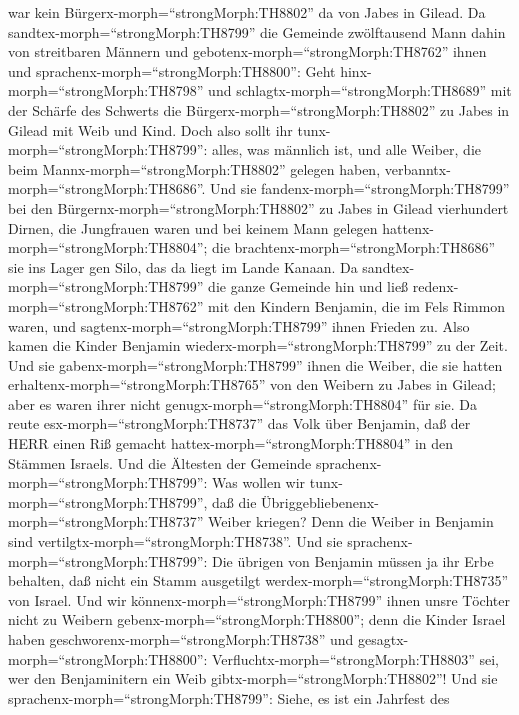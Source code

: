 war kein Bürgerx-morph=``strongMorph:TH8802'' da von Jabes in Gilead.
 Da sandtex-morph=``strongMorph:TH8799'' die Gemeinde
zwölftausend Mann dahin von streitbaren Männern und
gebotenx-morph=``strongMorph:TH8762'' ihnen und
sprachenx-morph=``strongMorph:TH8800'': Geht
hinx-morph=``strongMorph:TH8798'' und
schlagtx-morph=``strongMorph:TH8689'' mit der Schärfe des Schwerts die
Bürgerx-morph=``strongMorph:TH8802'' zu Jabes in Gilead mit Weib und
Kind.  Doch also sollt ihr
tunx-morph=``strongMorph:TH8799'': alles, was männlich ist, und alle
Weiber, die beim Mannx-morph=``strongMorph:TH8802'' gelegen haben,
verbanntx-morph=``strongMorph:TH8686''.  Und sie
fandenx-morph=``strongMorph:TH8799'' bei den
Bürgernx-morph=``strongMorph:TH8802'' zu Jabes in Gilead vierhundert
Dirnen, die Jungfrauen waren und bei keinem Mann gelegen
hattenx-morph=``strongMorph:TH8804''; die
brachtenx-morph=``strongMorph:TH8686'' sie ins Lager gen Silo, das da
liegt im Lande Kanaan.  Da
sandtex-morph=``strongMorph:TH8799'' die ganze Gemeinde hin und ließ
redenx-morph=``strongMorph:TH8762'' mit den Kindern Benjamin, die im
Fels Rimmon waren, und sagtenx-morph=``strongMorph:TH8799'' ihnen
Frieden zu.  Also kamen die Kinder Benjamin
wiederx-morph=``strongMorph:TH8799'' zu der Zeit. Und sie
gabenx-morph=``strongMorph:TH8799'' ihnen die Weiber, die sie hatten
erhaltenx-morph=``strongMorph:TH8765'' von den Weibern zu Jabes in
Gilead; aber es waren ihrer nicht genugx-morph=``strongMorph:TH8804''
für sie.  Da reute esx-morph=``strongMorph:TH8737'' das
Volk über Benjamin, daß der HERR einen Riß gemacht
hattex-morph=``strongMorph:TH8804'' in den Stämmen Israels.
 Und die Ältesten der Gemeinde
sprachenx-morph=``strongMorph:TH8799'': Was wollen wir
tunx-morph=``strongMorph:TH8799'', daß die
Übriggebliebenenx-morph=``strongMorph:TH8737'' Weiber kriegen? Denn die
Weiber in Benjamin sind vertilgtx-morph=``strongMorph:TH8738''.
 Und sie sprachenx-morph=``strongMorph:TH8799'': Die
übrigen von Benjamin müssen ja ihr Erbe behalten, daß nicht ein Stamm
ausgetilgt werdex-morph=``strongMorph:TH8735'' von Israel. 
Und wir könnenx-morph=``strongMorph:TH8799'' ihnen unsre Töchter nicht
zu Weibern gebenx-morph=``strongMorph:TH8800''; denn die Kinder Israel
haben geschworenx-morph=``strongMorph:TH8738'' und
gesagtx-morph=``strongMorph:TH8800'':
Verfluchtx-morph=``strongMorph:TH8803'' sei, wer den Benjaminitern ein
Weib gibtx-morph=``strongMorph:TH8802''!  Und sie
sprachenx-morph=``strongMorph:TH8799'': Siehe, es ist ein Jahrfest des
